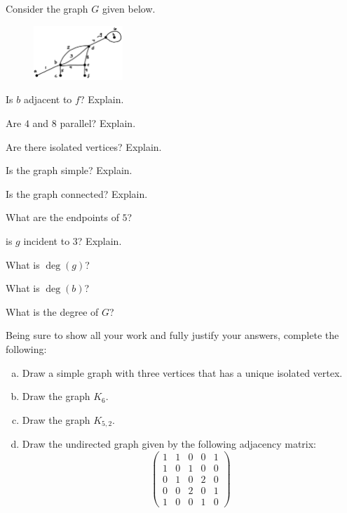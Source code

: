 \documentclass[11pt,letterpaper]{article}
\begin{document}

 Consider the graph $G$ given below.
	\begin{figure}[h]
	\centering
	\includegraphics[width=0.3\textwidth]{graph1.jpg}
	\end{figure}

\begin{2enumerate}
\item Is $b$ adjacent to $f$? Explain.
\item Are $4$ and $8$ parallel? Explain. 
\item Are there isolated vertices? Explain.
\item Is the graph simple? Explain. 
\item Is the graph connected? Explain. 
\item What are the endpoints of $5$?
\item is $g$ incident to $3$? Explain. 
\item What is $\deg(g)$?
\item What is $\deg(b)$?
\item What is the degree of $G$?
\end{2enumerate}




\newpage



 Being sure to show all your work and fully justify your answers, complete the following:
	\begin{enumerate}[(a)]
	\item Draw a simple graph with three vertices that has a unique isolated vertex. 
	\item Draw the graph $K_6$. 
	\item Draw the graph $K_{5, 2}$. 
	\item Draw the undirected graph given by the following adjacency matrix:
		\[
		\begin{pmatrix}
		1 & 1 & 0 & 0 & 1 \\
		1 & 0 & 1 & 0 & 0 \\
		0 & 1 & 0 & 2 & 0 \\
		0 & 0 & 2 & 0 & 1 \\
		1 & 0 & 0 & 1 & 0 
		\end{pmatrix}
		\]
	\end{enumerate}
\end{document}
